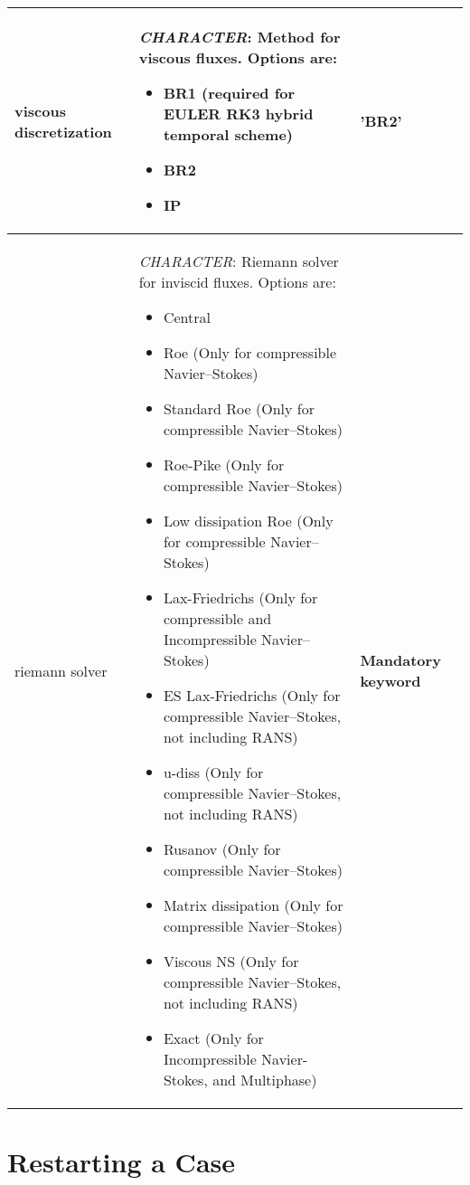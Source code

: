 \documentclass[a4paper,10pt]{report}
\begin{document}
\begin{longtable}{|p{4cm}|p{10cm}|p{2.2cm}|}
viscous discretization & \textit{CHARACTER}: Method for viscous fluxes. Options are:
    \begin{itemize}
    \item BR1 (required for EULER RK3 hybrid temporal scheme)
    \item BR2
    \item IP
    \end{itemize} 
                    & 'BR2' \\ \hline

riemann solver      & \textit{CHARACTER}: Riemann solver for inviscid fluxes. Options are:
    \begin{itemize}
    \item Central
    \item Roe (Only for compressible Navier–Stokes)
    \item Standard Roe (Only for compressible Navier–Stokes)
    \item Roe-Pike (Only for compressible Navier–Stokes)
    \item Low dissipation Roe (Only for compressible Navier–Stokes)
    \item Lax-Friedrichs (Only for compressible and Incompressible Navier–Stokes)
    \item ES Lax-Friedrichs (Only for compressible Navier–Stokes, not including RANS)
    \item u-diss (Only for compressible Navier–Stokes, not including RANS)
    \item Rusanov (Only for compressible Navier–Stokes)
    \item Matrix dissipation (Only for compressible Navier–Stokes)
    \item Viscous NS (Only for compressible Navier–Stokes, not including RANS)
    \item Exact (Only for Incompressible Navier-Stokes, and Multiphase)
    \end{itemize} 
                    & \textbf{Mandatory keyword} \\ \hline

\end{longtable}


\chapter{Restarting a Case}
\end{document}
